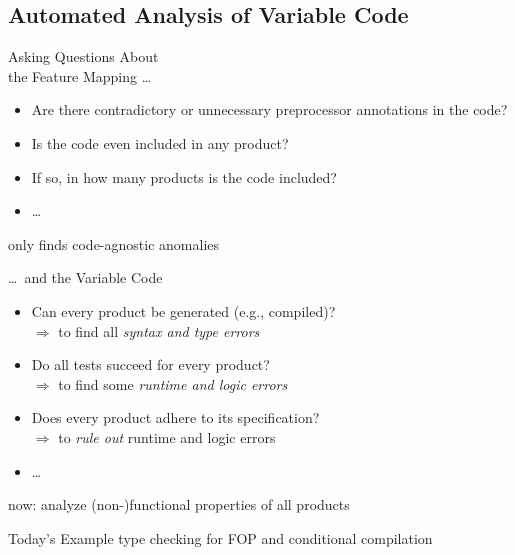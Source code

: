 \subsection{Automated Analysis of Variable Code}

\begin{frame}{\myframetitle}
	\begin{fancycolumns}[t,widths={46}]
		\begin{example}{Asking Questions About\\the Feature Mapping \ldots}
			\begin{itemize}
				\item Are there contradictory or unnecessary preprocessor annotations in the code?
				\item Is the code even included in any product?
				\item If so, in how many products is the code included?
				\item \ldots
			\end{itemize}
		\end{example}
		\begin{note}{}
			only finds code-agnostic anomalies
		\end{note}
		\nextcolumn{}
		\begin{example}{\ldots\ and the Variable Code}
			\begin{itemize}
				\item Can every product be generated (e.g., compiled)?\\
					$\Rightarrow$ to find all \emph{syntax and type errors}
				\item Do all tests succeed for every product?\\
					$\Rightarrow$ to find some \emph{runtime and logic errors}
				\item Does every product adhere to its specification?\\
					$\Rightarrow$ to \emph{rule out} runtime and logic errors
				\item \ldots
			\end{itemize}
		\end{example}
		\begin{note}{}
			now: analyze (non-)functional properties of all products
		\end{note}
		\begin{example}{Today's Example}
			type checking for FOP and conditional compilation
		\end{example}
	\end{fancycolumns}
\end{frame}


